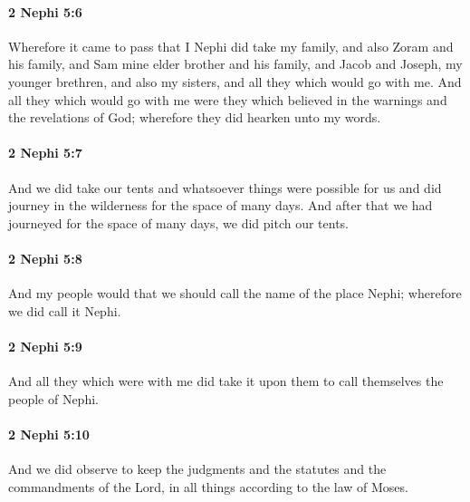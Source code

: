 		\paragraph{2 Nephi 5:6} %
			\label{2NEPHI-5-6}

			Wherefore it came to pass that I Nephi did take my family,
			and also Zoram and his family,
			and Sam mine elder brother and his family,
			and Jacob and Joseph, my younger brethren,
			and also my sisters,
			and all they which would go with me.
			And all they which would go with me were they
			which believed in the warnings and the revelations of God;
			wherefore they did hearken unto my words.

		\paragraph{2 Nephi 5:7} %
			\label{2NEPHI-5-7}

			And we did take our tents and whatsoever things were possible for us
			and did journey in the wilderness for the space of many days.
			And after that we had journeyed for the space of many days,
			we did pitch our tents.

		\paragraph{2 Nephi 5:8} %
			\label{2NEPHI-5-8}

			And my people would that we should call the name of the place Nephi;
			wherefore we did call it Nephi.

		\paragraph{2 Nephi 5:9} %
			\label{2NEPHI-5-9}

			And all they which were with me did take it upon them
			to call themselves the people of Nephi.

		\paragraph{2 Nephi 5:10} %
			\label{2NEPHI-5-10}

			And we did observe to keep the judgments and the statutes
			and the commandments of the Lord,
			in all things according to the law of Moses.

